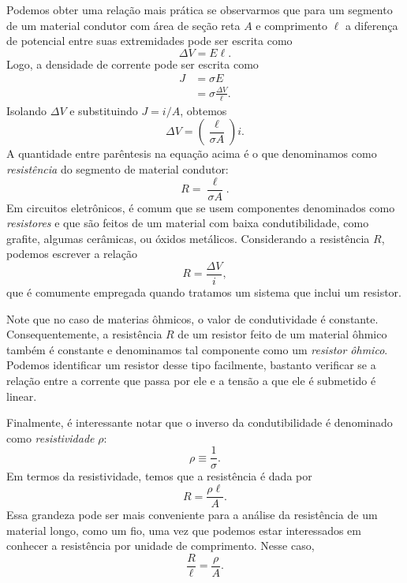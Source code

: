 Podemos obter uma relação mais prática se observarmos que para um segmento de um material condutor com área de seção reta $A$ e comprimento $\ell$ a diferença de potencial entre suas extremidades pode ser escrita como
\begin{equation}
    \Delta V = E\ell.
\end{equation}
%
Logo, a densidade de corrente pode ser escrita como
\begin{align}
    J &= \sigma E \\
    &= \sigma \frac{\Delta V}{\ell}.
\end{align}
%
Isolando $\Delta V$ e substituindo $J = i / A$, obtemos
\begin{equation}
    \Delta V = \left(\frac{\ell}{\sigma A}\right) i.
\end{equation}
%
A quantidade entre parêntesis na equação acima é o que denominamos como \emph{resistência} do segmento de material condutor:
\begin{equation}
    R = \frac{\ell}{\sigma A}.
\end{equation}
%
Em circuitos eletrônicos, é comum que se usem componentes denominados como \emph{resistores} e que são feitos de um material com baixa condutibilidade, como grafite, algumas cerâmicas, ou óxidos metálicos. Considerando a resistência $R$, podemos escrever a relação
\begin{equation}
    R = \frac{\Delta V}{i},
\end{equation}
%
que é comumente empregada quando tratamos um sistema que inclui um resistor.

Note que no caso de materias ôhmicos, o valor de condutividade é constante. Consequentemente, a resistência $R$ de um resistor feito de um material ôhmico também é constante e denominamos tal componente como um \emph{resistor ôhmico}. Podemos identificar um resistor desse tipo facilmente, bastanto verificar se a relação entre a corrente que passa por ele e a tensão a que ele é submetido é linear.

Finalmente, é interessante notar que o inverso da condutibilidade é denominado como \emph{resistividade} $\rho$:
\begin{equation}
    \rho \equiv \frac{1}{\sigma}.
\end{equation}
%
Em termos da resistividade, temos que a resistência é dada por
\begin{equation}
    R = \frac{\rho \ell}{A}.
\end{equation}
%
Essa grandeza pode ser mais conveniente para a análise da resistência de um material longo, como um fio, uma vez que podemos estar interessados em conhecer a resistência por unidade de comprimento. Nesse caso,
\begin{equation}
    \frac{R}{\ell} = \frac{\rho}{A}.
\end{equation}

